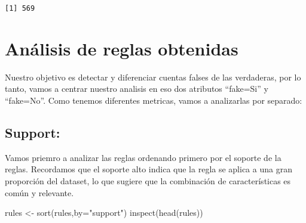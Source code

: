 \documentclass[
  letterpaper,
  DIV=11,
  numbers=noendperiod]{scrreprt}
\newenvironment{Shaded}{\begin{snugshade}}{\end{snugshade}}
\newcommand{\AttributeTok}[1]{\textcolor[rgb]{0.40,0.45,0.13}{#1}}
\newcommand{\FunctionTok}[1]{\textcolor[rgb]{0.28,0.35,0.67}{#1}}
\newcommand{\NormalTok}[1]{\textcolor[rgb]{0.00,0.23,0.31}{#1}}
\newcommand{\OtherTok}[1]{\textcolor[rgb]{0.00,0.23,0.31}{#1}}
\newcommand{\StringTok}[1]{\textcolor[rgb]{0.13,0.47,0.30}{#1}}
\begin{document}
\begin{verbatim}
[1] 569
\end{verbatim}

\section{Análisis de reglas
obtenidas}\label{anuxe1lisis-de-reglas-obtenidas}

Nuestro objetivo es detectar y diferenciar cuentas falses de las
verdaderas, por lo tanto, vamos a centrar nuestro analisis en eso dos
atributos ``fake=Si'' y ``fake=No''. Como tenemos diferentes metricas,
vamos a analizarlas por separado:

\subsection{Support:}\label{support}

Vamos priemro a analizar las reglas ordenando primero por el soporte de
la reglas. Recordamos que el soporte alto indica que la regla se aplica
a una gran proporción del dataset, lo que sugiere que la combinación de
características es común y relevante.

\begin{Shaded}
\begin{Highlighting}[]
\NormalTok{rules }\OtherTok{\textless{}{-}} \FunctionTok{sort}\NormalTok{(rules,}\AttributeTok{by=}\StringTok{"support"}\NormalTok{)}
\FunctionTok{inspect}\NormalTok{(}\FunctionTok{head}\NormalTok{(rules))}
\end{Highlighting}
\end{Shaded}
\end{document}
